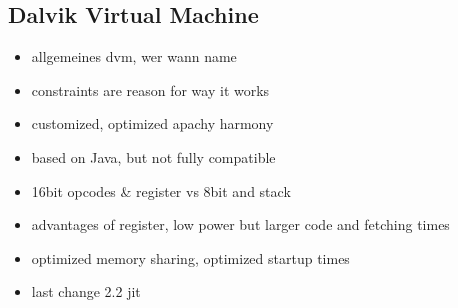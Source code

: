 \subsection{Dalvik Virtual Machine} \label{subsection:android-dalvik}
\begin{itemize}
  \item allgemeines dvm, wer wann name
  \item constraints are reason for way it works
  \item customized, optimized apachy harmony
  \item based on Java, but not fully compatible
  \item 16bit opcodes & register vs 8bit and stack
  \item advantages of register, low power but larger code and fetching times
  \item optimized memory sharing, optimized startup times
  \item last change 2.2 jit
\end{itemize}
